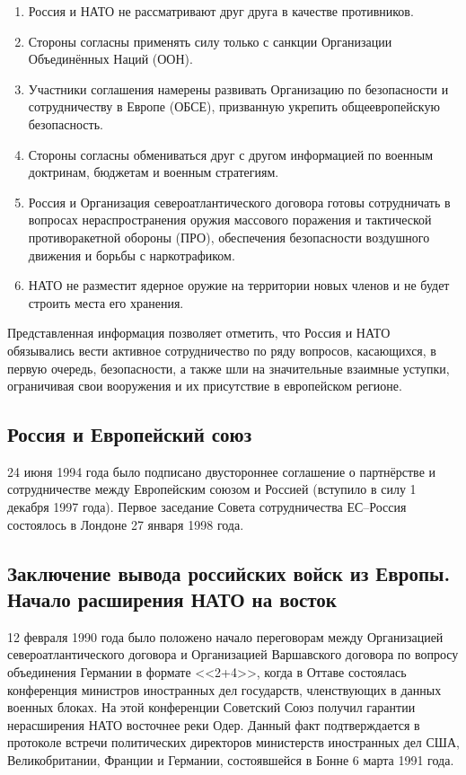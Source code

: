 \begin{enumerate}
  \item Россия и НАТО не рассматривают друг друга в качестве противников.
  \item Стороны согласны применять силу только с санкции Организации Объединённых Наций (ООН).
  \item Участники соглашения намерены развивать Организацию по безопасности и сотрудничеству в Европе (ОБСЕ), призванную укрепить общеевропейскую безопасность.
  \item Стороны согласны обмениваться друг с другом информацией по военным доктринам, бюджетам и военным стратегиям.
  \item Россия и Организация североатлантического договора готовы сотрудничать в вопросах нераспространения оружия массового поражения и тактической противоракетной обороны (ПРО), обеспечения безопасности воздушного движения и борьбы с наркотрафиком.
  \item НАТО не разместит ядерное оружие на территории новых членов и не будет строить места его хранения.
\end{enumerate}
  Представленная информация позволяет отметить, что Россия и НАТО обязывались вести активное сотрудничество по ряду вопросов, касающихся, в первую очередь, безопасности, а также шли на значительные взаимные уступки, ограничивая свои вооружения и их присутствие в европейском регионе.
\subsection{Россия и Европейский союз}
24 июня 1994 года было подписано двустороннее соглашение о партнёрстве и сотрудничестве между Европейским союзом и Россией (вступило в силу 1 декабря 1997 года). Первое заседание Совета сотрудничества ЕС--Россия состоялось в Лондоне 27 января 1998 года.
\subsection{Заключение вывода российских войск из Европы. Начало расширения НАТО на восток}
12 февраля 1990 года было положено начало переговорам между Организацией североатлантического договора и Организацией Варшавского договора по вопросу объединения Германии в формате <<2+4>>, когда в Оттаве состоялась конференция министров иностранных дел государств, членствующих в данных военных блоках. На этой конференции Советский Союз получил гарантии нерасширения НАТО восточнее реки Одер. Данный факт подтверждается в протоколе встречи политических директоров министерств иностранных дел США, Великобритании, Франции и Германии, состоявшейся в Бонне 6 марта 1991 года.

